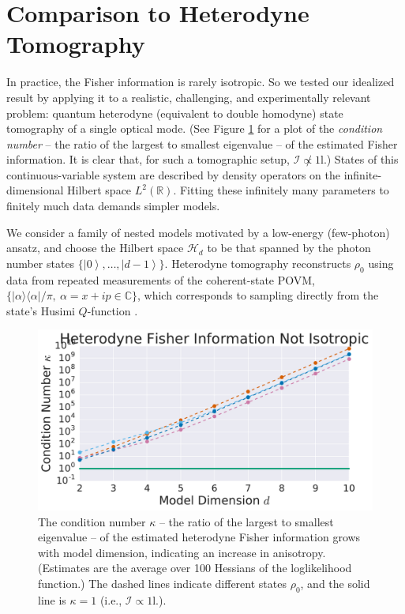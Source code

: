 \documentclass[aps,pra, twocolumn]{revtex4-1}
\newcommand{\reals}{\mathbb{R}}
\newcommand{\Id}{\mathbb{I}}
\newcommand{\ket}[1]{\ensuremath{\left|#1\right\rangle}}
\def\Id{1\!\mathrm{l}}
\begin{document}
\section{Comparison to Heterodyne Tomography}
\label{sec:heterotomo}
In practice, the Fisher information is rarely isotropic.  So we tested our idealized result by applying it to a realistic, challenging, and experimentally relevant problem: quantum heterodyne (equivalent to double homodyne) state tomography \cite{Lvovsky2001a, Bertrand1987, Leonhardt1995, Lvovsky2009} of a single optical mode.  (See Figure \ref{fig:fish_condition} for a plot of the \emph{condition number} -- the ratio of the largest to smallest eigenvalue -- of the estimated Fisher information. It is clear that, for such a tomographic setup, $\mathcal{I} \not \propto \Id$.) States of this continuous-variable system are described by density operators on the infinite-dimensional Hilbert space $L^2(\reals)$.  Fitting these infinitely many parameters to finitely much data demands simpler models.

We consider a family of nested models motivated by a low-energy (few-photon) ansatz, and choose   
the Hilbert space $\mathcal{H}_d$ to be that spanned by the photon number states $\{\ket{0},\ldots ,\ket{d-1}\}$.
Heterodyne tomography reconstructs $\rho_{0}$ using data from repeated measurements of the 
coherent-state POVM, $\{|\alpha\rangle\langle \alpha| /\pi, ~\alpha=x+ip\in \mathbb{C}\}$, which corresponds to sampling directly from the 
state's Husimi $Q$-function \cite{Husimi1940}.

\begin{figure}[h]
  \includegraphics[width=\columnwidth]{Images/Figure_7.pdf}
 \caption{The condition number $\kappa$ -- the ratio of the largest to smallest eigenvalue -- of the estimated heterodyne Fisher information grows with model dimension, indicating an increase in anisotropy. (Estimates are the average over 100 Hessians of the loglikelihood function.) The dashed lines indicate different states $\rho_{0}$, and the solid line is $\kappa = 1$ (i.e., $\mathcal{I} \propto \Id$.).}
\label{fig:fish_condition}
\end{figure}
\end{document}
